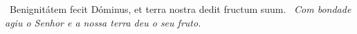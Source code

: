 \begin{paracol}{2}
  \Antiphona~Benignitátem fecit Dóminus, et terra nostra dedit fructum suum.
  \switchcolumn
  \Antiphona~\emph{Com bondade agiu o Senhor e a nossa terra deu o seu fruto.}
\end{paracol}